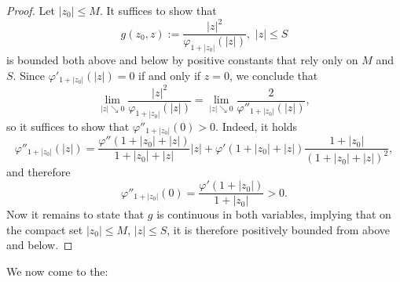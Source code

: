 \documentclass[a4paper,11pt]{amsart}
\numberwithin{equation}{section}
\begin{document}
	\begin{proof}
		Let $|z_0| \leq M$. It suffices to show that \[
		g(z_0,z):=\frac{|z|^2}{\varphi_{1+|z_0|}(|z|)}, \,\, |z| \leq S
		\]
		is bounded both above and below by positive constants that rely only on $M$ and $S$. Since $\varphi'_{1+|z_0|}(|z|) = 0$ if and only if $z=0$, we conclude that \[
		\lim \limits_{|z| \searrow 0}  \frac{|z|^2}{\varphi_{1+|z_0|}(|z|)} = \lim \limits_{|z| \searrow 0} \frac{2}{\varphi''_{1+|z_0|}(|z|)},
		\]
		so it suffices to show that $\varphi''_{1+|z_0|}(0) > 0$. Indeed, it holds \[
		\varphi''_{1+|z_0|}(|z|) = \frac{\varphi''(1+|z_0|+|z|)}{1+|z_0|+|z|}|z| + \varphi'(1+|z_0|+|z|)\frac{1+|z_0|}{(1+|z_0|+|z|)^2},
		\]
		and therefore \[
		\varphi''_{1+|z_0|}(0) = \frac{\varphi'(1+|z_0|)}{1+|z_0|} > 0.
		\]
		Now it remains to state that $g$ is continuous in both variables, implying that on the compact set $|z_0|\leq M$, $|z| \leq S$, it is therefore positively bounded from above and below.
	\end{proof}
	We now come to the: 
\end{document}
